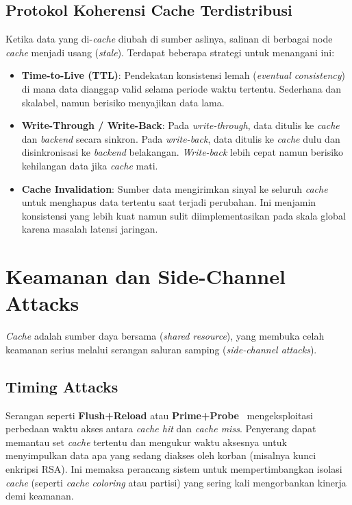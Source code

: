 \subsection{Protokol Koherensi Cache Terdistribusi}
Ketika data yang di-\textit{cache} diubah di sumber aslinya, salinan
di berbagai node \textit{cache} menjadi usang (\textit{stale}).
Terdapat beberapa strategi untuk menangani ini:
\begin{itemize}
  \item \textbf{Time-to-Live (TTL)}: Pendekatan konsistensi lemah
    (\textit{eventual consistency})
    di mana data dianggap valid selama periode waktu tertentu. Sederhana
    dan skalabel, namun berisiko menyajikan data lama.
  \item \textbf{Write-Through / Write-Back}: Pada \textit{write-through},
    data ditulis ke \textit{cache} dan \textit{backend} secara sinkron.
    Pada \textit{write-back}, data ditulis ke \textit{cache} dulu dan
    disinkronisasi ke \textit{backend} belakangan. \textit{Write-back}
    lebih cepat namun berisiko kehilangan data jika \textit{cache} mati.
  \item \textbf{Cache Invalidation}: Sumber data mengirimkan sinyal
    ke seluruh \textit{cache} untuk menghapus data tertentu saat
    terjadi perubahan.
    Ini menjamin konsistensi yang lebih kuat namun sulit diimplementasikan
    pada skala global karena masalah latensi jaringan.
\end{itemize}

\section{Keamanan dan Side-Channel Attacks}
\textit{Cache} adalah sumber daya bersama (\textit{shared resource}),
yang membuka celah keamanan serius melalui serangan saluran samping
(\textit{side-channel attacks}).

\subsection{Timing Attacks}
Serangan seperti \textbf{Flush+Reload} atau
\textbf{Prime+Probe}~\cite{Yarom2014FlushReload}
mengeksploitasi perbedaan waktu akses antara \textit{cache hit} dan
\textit{cache miss}.
Penyerang dapat memantau set \textit{cache} tertentu dan mengukur waktu
aksesnya untuk menyimpulkan data apa yang sedang diakses oleh korban
(misalnya kunci enkripsi RSA).
Ini memaksa perancang sistem untuk mempertimbangkan isolasi \textit{cache}
(seperti \textit{cache coloring} atau partisi) yang sering kali
mengorbankan kinerja demi keamanan.

